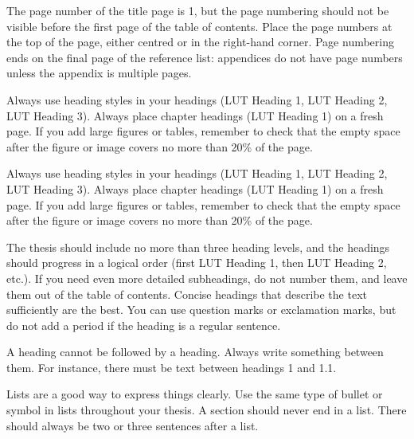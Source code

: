 The page number of the title page is 1, but the page numbering should not be visible before the first page of the table of contents. Place the page numbers at the top of the page, either centred or in the right-hand corner. Page numbering ends on the final page of the reference list: appendices do not have page numbers unless the appendix is multiple pages.

Always use heading styles in your headings (LUT Heading 1, LUT Heading 2, LUT Heading 3). Always place chapter headings (LUT Heading 1) on a fresh page. If you add large figures or tables, remember to check that the empty space after the figure or image covers no more than 20\% of the page.

Always use heading styles in your headings (LUT Heading 1, LUT Heading 2, LUT Heading 3). Always place chapter headings (LUT Heading 1) on a fresh page. If you add large figures or tables, remember to check that the empty space after the figure or image covers no more than 20\% of the page.

The thesis should include no more than three heading levels, and the headings should progress in a logical order (first LUT Heading 1, then LUT Heading 2, etc.). If you need even more detailed subheadings, do not number them, and leave them out of the table of contents. Concise headings that describe the text sufficiently are the best. You can use question marks or exclamation marks, but do not add a period if the heading is a regular sentence.

A heading cannot be followed by a heading. Always write something between them. For instance, there must be text between headings 1 and 1.1.

Lists are a good way to express things clearly. Use the same type of bullet or symbol in lists throughout your thesis. A section should never end in a list. There should always be two or three sentences after a list.